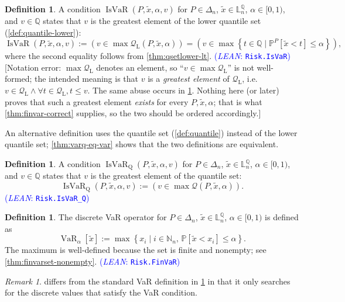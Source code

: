 \documentclass[letterpaper]{article}
\theoremstyle{plain}
\theoremstyle{definition}
\newtheorem{definition}[theorem]{Definition}
\theoremstyle{remark}
\newtheorem{remark}[theorem]{Remark}
\newcommand{\Nats}{\mathbb{N}}
\newcommand{\PP}{\mathbb{P}}
\DeclareMathOperator{\finvar}{VaR}
\DeclareMathOperator{\isvar}{IsVaR}
\newcommand{\cc}[1]{\textcolor{ccolor}{[#1]}}
\newcommand{\lean}[1]{\textcolor{blue}{(\emph{LEAN}: \texttt{#1})}}
\newcommand{\leanok}{}
\begin{document}
\begin{definition} \label{def:var}
A condition $\isvar(P,\tilde{x},\alpha,v)$ for $P\in \Delta_n$, $\tilde{x}\in \mathbb{L}_n^{\mathbb{Q}}$, $\alpha\in [0,1)$, and $v\in \mathbb{Q}$ states that $v$ is the greatest element of the lower quantile set (\cref{def:quantile-lower}):
  \[
   \isvar(P,\tilde{x},\alpha,v) := \left(v \in \max \mathcal{Q}_{\mathrm{L}}(P, \tilde{x}, \alpha)\right)
   = \left(v \in \max \left\{ t \in \mathbb{Q} \mid  \PP^P[\tilde{x} < t] \le \alpha \right\}\right),
 \]
 where the second equality follows from \cref{thm:qsetlower-lt}.
 \lean{Risk.IsVaR} \leanok
 \cc{Notation error: $\max \mathcal{Q}_{\mathrm{L}}$ denotes an element, so ``$v \in \max \mathcal{Q}_{\mathrm{L}}$'' is not well-formed; the intended meaning is that $v$ is a \emph{greatest element} of $\mathcal{Q}_{\mathrm{L}}$, i.e.\ $v\in \mathcal{Q}_{\mathrm{L}} \wedge \forall t\in \mathcal{Q}_{\mathrm{L}}, t\le v$. The same abuse occurs in \cref{def:var-q}. Nothing here (or later) proves that such a greatest element \emph{exists} for every $P,\tilde{x},\alpha$; that is what \cref{thm:finvar-correct} supplies, so the two should be ordered accordingly.}
\end{definition}

An alternative definition uses the quantile set (\cref{def:quantile}) instead of the lower quantile set; \cref{thm:varq-eq-var} shows that the two definitions are equivalent.
\begin{definition} \label{def:var-q}
A condition $\isvar_{\mathrm{Q}}(P,\tilde{x},\alpha,v)$ for $P\in \Delta_n$, $\tilde{x}\in \mathbb{L}_n^{\mathbb{Q}}$, $\alpha\in [0,1)$, and $v\in \mathbb{Q}$ states that $v$ is the greatest element of the quantile set:
  \[
   \isvar_{\mathrm{Q}}(P,\tilde{x},\alpha,v) := \left(v \in \max \mathcal{Q}(P, \tilde{x}, \alpha)\right).
 \]
 \lean{Risk.IsVaR\_Q} \leanok
\end{definition}

\begin{definition} \label{def:finvar}
The discrete VaR operator for $P\in \Delta_n$, $\tilde{x}\in \mathbb{L}_n^{\mathbb{Q}}$, $\alpha\in [0,1)$ is defined as
\[
  \finvar_{\alpha } \left[ \tilde{x} \right]
  :=
  \max \left\{ x_i \mid i\in \Nats_n,\, \PP \left[ \tilde{x} < x_i \right] \le \alpha  \right\}.
\]
The maximum is well-defined because the set is finite and nonempty; see \cref{thm:finvarset-nonempty}.
\lean{Risk.FinVaR} \leanok
\end{definition}

\begin{remark}
 differs from the standard VaR definition in \cref{def:var} in that it only searches for the discrete values that satisfy the VaR condition.
\end{remark}
\end{document}
